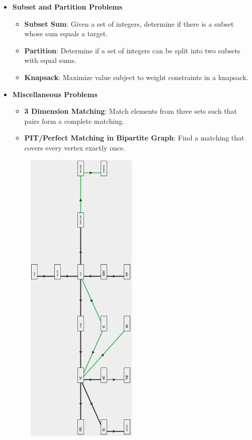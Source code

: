 \documentclass[10pt,landscape]{article}
\newcommand{\1}{\mathmybb{1}}
\begin{document}
\begin{multicols*}{3}
\begin{itemize}[topsep=0pt,noitemsep,wide=0pt, leftmargin=\dimexpr{} + 2\relax]
\begin{itemize}[topsep=0pt,noitemsep,wide=0pt, leftmargin=\dimexpr{} + 2\relax]
  \end{itemize}
  \item \textbf{Subset and Partition Problems}
  \begin{itemize}[topsep=0pt,noitemsep,wide=0pt, leftmargin=\dimexpr{} + 2\relax]
      \item \textbf{Subset Sum}: Given a set of integers, determine if there is a subset whose sum equals a target.
      \item \textbf{Partition}: Determine if a set of integers can be split into two subsets with equal sums.
      \item \textbf{Knapsack}: Maximize value subject to weight constraints in a knapsack.
  \end{itemize}
  \item \textbf{Miscellaneous Problems}
  \begin{itemize}[topsep=0pt,noitemsep,wide=0pt, leftmargin=\dimexpr{} + 2\relax]
      \item \textbf{3 Dimension Matching}: Match elements from three sets such that pairs form a complete matching.
      \item \textbf{PIT/Perfect Matching in Bipartite Graph}: Find a matching that covers every vertex exactly once.
  \end{itemize}
\end{itemize}
\includegraphics*[width=8.5cm, height=14.5cm]{images/npcompleteproblems.PNG}


\end{multicols*}
\end{document}
